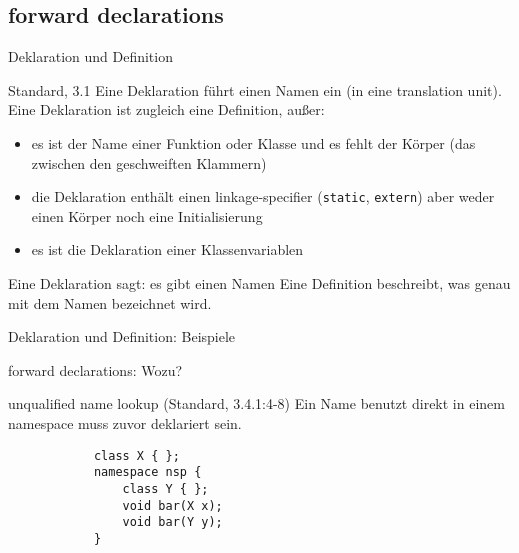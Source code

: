 \subsection{forward declarations}

\begin{frame}[fragile]{Deklaration und Definition}
	\begin{block}{Standard, 3.1}
		Eine Deklaration führt einen Namen ein (in eine translation unit).
		Eine Deklaration ist zugleich eine Definition, außer:
		\begin{itemize}[<+->]
			\item es ist der Name einer Funktion oder Klasse und es fehlt der Körper {\tiny (das zwischen den geschweiften Klammern) }
			\item die Deklaration enthält einen linkage-specifier (\verb|static|, \verb|extern|) aber weder einen Körper noch eine Initialisierung
			\item es ist die Deklaration einer Klassenvariablen
		\end{itemize}
	\end{block}
	
	\vspace{1em}
	
	\uncover<+->
	{
		Eine Deklaration sagt: es gibt einen Namen
		Eine Definition beschreibt, was genau mit dem Namen bezeichnet wird.
	}
\end{frame}


\begin{frame}{Deklaration und Definition: Beispiele}
	\onslide*<+>
		
		
	\onslide*<+>
		
\end{frame}


\begin{frame}[fragile]{forward declarations: Wozu?}
	\begin{block}{unqualified name lookup (Standard, 3.4.1:4-8)}
		Ein Name benutzt direkt in einem namespace muss zuvor deklariert sein.
		
		\vspace{1em}
		
		\begin{lstlisting}
			class X { };
			namespace nsp {
			    class Y { };
			    void bar(X x);
			    void bar(Y y);
			}
		\end{lstlisting}
	\end{block}
\end{frame}


